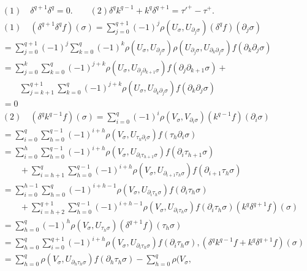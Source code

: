 \vskip -1cm
\pageoriginale
\begin{align*}
& (1) \quad \delta^{q+1} \delta^q = 0. \qquad (2)\delta^q k^{q-1} +
  k^q \delta^{q+1} = \tau'^+ - \tau^+.\\ 
& (1)\quad (\delta^{q+1} \delta^q f)(\sigma) = \sum^{q+1}_{j=0}(-1)^j
  \rho(U_{\sigma}, U_{\partial_j \sigma}) (\delta^q f) (\partial_j
  \sigma)\\ 
& = \sum^{q+1}_{j=0}(-1)^j \sum^{q}_{k=0}(-1)^k \rho (U_{\sigma},
  U_{\partial_j \sigma}) \rho(U_{\partial_j \sigma} , U_{\partial_k
    \partial_j \sigma}) f(\partial_k \partial_j \sigma)\\ 
& = \sum^k_{j=0}\sum^{q}_{k=0}(-1)^{j+k} \rho (U_{\sigma},
  U_{\partial_ j \partial_{k+1} \sigma}) f(\partial_j \partial_{k+1}
  \sigma) +\\
& \qquad  \sum^{q+1}_{j=k+1} \sum^{q}_{k=0}(-1)^{j+k}
  \rho(U_{\sigma} , U_{\partial_k \partial_j \sigma}) f(\partial_k
  \partial_j \sigma)\\ 
& =0\\ 
 & (2)\quad (\delta^q k^{q-1} f)(\sigma) = \sum^{q}_{i=0} (-1)^i
  \rho(V_{\sigma}, V_{\partial_i \sigma}) (k^{q-1} f) (\partial_i
  \sigma)\\ 
 &= \sum^{q}_{i=0} \sum^{q-1}_{h=0}(-1)^{i+h} \rho (V_{\sigma},
  U_{\tau_h \partial_i  \sigma})  f(\tau_h \partial_i  \sigma)\\ 
 & = \sum^h_{i=0}\sum^{q-1}_{h=0}(-1)^{i+h} \rho (V_{\sigma},
  U_{\partial_i \tau_{h+1} \sigma}) f(\partial_i \tau_{h+1} \sigma)
  \\ 
& \qquad + 
  \sum^{q}_{i=h+1} \sum^{q-1}_{h=0}(-1)^{i+h} \rho(V_{\sigma} ,
  U_{\partial_{i+1}\tau_h \sigma}) f(\partial_{i+1} \tau_h \sigma)\\ 
 & = \sum^{h-1}_{i=0}\sum^{q}_{h=0}(-1)^{i+h-1} \rho (V_{\sigma},
  U_{\partial_i \tau_h \sigma}) f(\partial_i \tau_h \sigma) \\
& \qquad +
  \sum^{q+1}_{i=h+2} \sum^{q-1}_{h=0}(-1)^{i+h-1} \rho(V_{\sigma} ,
  U_{\partial_i \tau_h \sigma}) f(\partial_i \tau_h \sigma) (k^q
  \delta^{q+1} f) (\sigma)\\
& =\sum^{q}_{h=0}(-1)^h \rho (V_\sigma
  ,U_{\tau_h \sigma}) (\delta^{q+1} f) (\tau_h \sigma) \\ 
 & = \sum^q_{h=0}\sum^{q+1}_{i=0}(-1)^{i+h} \rho (V_{\sigma},
  U_{\partial_i \tau_h \sigma}) f(\partial_i \tau_h
  \sigma),  (\delta^q k^{q-1} f + k^q \delta^{q+1} f) (\sigma)\\
&  = \sum^{q}_{h=0} \rho (V_\sigma , U_{\partial_h \tau_h \sigma})
  f(\partial_h \tau_h \sigma) - \sum^{q}_{h=0} \rho(V_{\sigma},

\end{align*}
